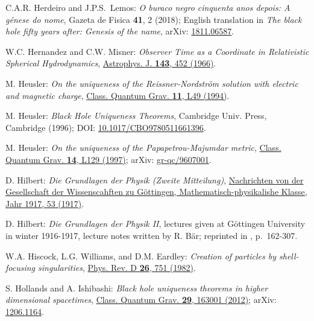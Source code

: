 \begin{thebibliography}{123}
C.A.R. Herdeiro and J.P.S.~Lemos:
\emph{O buraco negro cinquenta anos depois:
A génese do nome},
Gazeta de Fisica {\bf 41}, 2 (2018); English translation in
\emph{The black hole fifty years after: Genesis of the name},
arXiv: \href{https://arxiv.org/abs/1811.06587}{1811.06587}.

W.C. Hernandez and C.W. Misner:
{\em Observer Time as a Coordinate in Relativistic Spherical Hydrodynamics},
\href{https://doi.org/10.1086/148525}{Astrophys. J. {\bf 143}, 452 (1966)}.

M. Heusler:
{\em On the uniqueness of the Reissner-Nordström solution with electric and magnetic charge},
\href{https://doi.org/10.1088/0264-9381/11/3/003}{Class. Quantum Grav. {\bf 11}, L49 (1994)}.

M. Heusler:
{\em Black Hole Uniqueness Theorems},
Cambridge Univ. Press, Cambridge (1996);
DOI: \href{https://doi.org/10.1017/CBO9780511661396}{10.1017/CBO9780511661396}.

M. Heusler:
{\em On the uniqueness of the Papapetrou-Majumdar metric},
\href{https://doi.org/10.1088/0264-9381/14/7/001}{Class. Quantum Grav. {\bf 14}, L129 (1997)};
arXiv: \href{https://arxiv.org/abs/gr-qc/9607001}{gr-qc/9607001}.

D. Hilbert:
{\em Die Grundlagen der Physik (Zweite Mitteilung)},
\href{https://gdz.sub.uni-goettingen.de/id/PPN252457811_1917}{Nachrichten von der Gesellschaft der Wissenscahften zu Göttingen, Mathematisch-physikalishe Klasse, Jahr 1917, 53 (1917)}.

D. Hilbert:
{\em Die Grundlagen der Physik II},
lectures given at Göttingen University in winter 1916-1917,
lecture notes written by R. Bär; reprinted
in \cite{SauerM09}, p.~162-307.

W.A. Hiscock, L.G. Williams, and D.M. Eardley:
{\em Creation of particles by shell-focusing singularities},
\href{https://doi.org/10.1103/PhysRevD.26.751}{Phys. Rev. D {\bf 26}, 751 (1982)}.

S. Hollands and A. Ishibashi:
{\em Black hole uniqueness theorems in higher dimensional spacetimes},
\href{https://doi.org/10.1088/0264-9381/29/16/163001}{Class. Quantum Grav. {\bf 29}, 163001 (2012)};
arXiv: \href{https://arxiv.org/abs/1206.1164}{1206.1164}.


\end{thebibliography}
